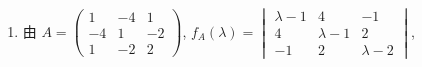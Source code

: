 	 \paragraph{} %
		 \begin{enumerate}
			 \item %
			       由 \( A = \begin{pmatrix}
				       1  & -4 & 1  \\
				       -4 & 1  & -2 \\
				       1  & -2 & 2
			       \end{pmatrix} \), \( f_{A}(\lambda) = \begin{vmatrix}
				       \lambda - 1 & 4           & -1          \\
				       4           & \lambda - 1 & 2           \\
				       -1          & 2           & \lambda - 2
			       \end{vmatrix} \),


\end{enumerate}
